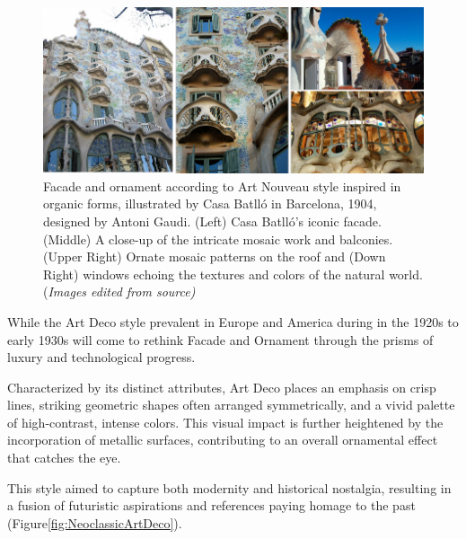      \begin{figure}[htb]
          \centering
          \includegraphics[width= \linewidth]{Images/ArtnouveauGaudi}
          \caption{Facade and ornament according to Art Nouveau style inspired in organic forms, illustrated by Casa Batlló in Barcelona, 1904, designed by Antoni Gaudi. (Left) Casa Batlló's iconic facade. (Middle) A close-up of the intricate mosaic work and balconies. (Upper Right) Ornate mosaic patterns on the roof and (Down Right) windows echoing the textures and colors of the natural world. (\textit{Images edited from source)}}
          \label{fig:ArtNouveaustyle}
        \end{figure}

While the Art Deco style prevalent in Europe and America during in the 1920s to early 1930s will come to rethink Facade and Ornament through the prisms of luxury and technological progress.

Characterized by its distinct attributes, Art Deco places an emphasis on crisp lines, striking geometric shapes often arranged symmetrically, and a vivid palette of high-contrast, intense colors.
This visual impact is further heightened by the incorporation of metallic surfaces, contributing to an overall ornamental effect that catches the eye\cite{Kotb2014}.

This style aimed to capture both modernity and historical nostalgia, resulting in a fusion of futuristic aspirations and references paying homage to the past (Figure\ref{fig:NeoclassicArtDeco}).

